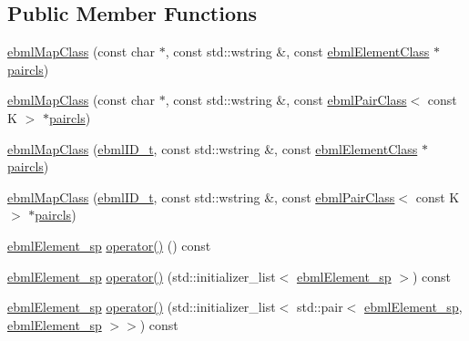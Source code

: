 \subsection*{Public Member Functions}
\begin{DoxyCompactItemize}
\item 
\mbox{\hyperlink{classebml_1_1ebmlMapClass_a54fe6d042e1b2e5c4ba9f8e3d7bba452}{ebml\+Map\+Class}} (const char $\ast$, const std\+::wstring \&, const \mbox{\hyperlink{classebml_1_1ebmlElementClass}{ebml\+Element\+Class}} $\ast$\mbox{\hyperlink{classebml_1_1ebmlMapClass_ad38f9bbe85f05f8865e9df739ab34792}{paircls}})
\item 
\mbox{\hyperlink{classebml_1_1ebmlMapClass_afe37bc0187986569ba263fe2a5e69915}{ebml\+Map\+Class}} (const char $\ast$, const std\+::wstring \&, const \mbox{\hyperlink{classebml_1_1ebmlPairClass}{ebml\+Pair\+Class}}$<$ const K $>$ $\ast$\mbox{\hyperlink{classebml_1_1ebmlMapClass_ad38f9bbe85f05f8865e9df739ab34792}{paircls}})
\item 
\mbox{\hyperlink{classebml_1_1ebmlMapClass_a27b494be5247aa4152bf994906ec117b}{ebml\+Map\+Class}} (\mbox{\hyperlink{namespaceebml_a86c5f604ddf12a74aa9812e997a58691}{ebml\+I\+D\+\_\+t}}, const std\+::wstring \&, const \mbox{\hyperlink{classebml_1_1ebmlElementClass}{ebml\+Element\+Class}} $\ast$\mbox{\hyperlink{classebml_1_1ebmlMapClass_ad38f9bbe85f05f8865e9df739ab34792}{paircls}})
\item 
\mbox{\hyperlink{classebml_1_1ebmlMapClass_a705b59b34949371aa925dc98e59213de}{ebml\+Map\+Class}} (\mbox{\hyperlink{namespaceebml_a86c5f604ddf12a74aa9812e997a58691}{ebml\+I\+D\+\_\+t}}, const std\+::wstring \&, const \mbox{\hyperlink{classebml_1_1ebmlPairClass}{ebml\+Pair\+Class}}$<$ const K $>$ $\ast$\mbox{\hyperlink{classebml_1_1ebmlMapClass_ad38f9bbe85f05f8865e9df739ab34792}{paircls}})
\item 
\mbox{\hyperlink{namespaceebml_adad533b7705a16bb360fe56380c5e7be}{ebml\+Element\+\_\+sp}} \mbox{\hyperlink{classebml_1_1ebmlMapClass_a92f0ffcbc555bdb6cbef10454a192640}{operator()}} () const
\item 
\mbox{\hyperlink{namespaceebml_adad533b7705a16bb360fe56380c5e7be}{ebml\+Element\+\_\+sp}} \mbox{\hyperlink{classebml_1_1ebmlMapClass_a65bc7cbdb0b605e7476222e28ebfcf46}{operator()}} (std\+::initializer\+\_\+list$<$ \mbox{\hyperlink{namespaceebml_adad533b7705a16bb360fe56380c5e7be}{ebml\+Element\+\_\+sp}} $>$) const
\item 
\mbox{\hyperlink{namespaceebml_adad533b7705a16bb360fe56380c5e7be}{ebml\+Element\+\_\+sp}} \mbox{\hyperlink{classebml_1_1ebmlMapClass_a8163549b01fe31fcb130f5bc8d4250d7}{operator()}} (std\+::initializer\+\_\+list$<$ std\+::pair$<$ \mbox{\hyperlink{namespaceebml_adad533b7705a16bb360fe56380c5e7be}{ebml\+Element\+\_\+sp}}, \mbox{\hyperlink{namespaceebml_adad533b7705a16bb360fe56380c5e7be}{ebml\+Element\+\_\+sp}} $>$$>$) const
$$
\end{DoxyCompactItemize}
